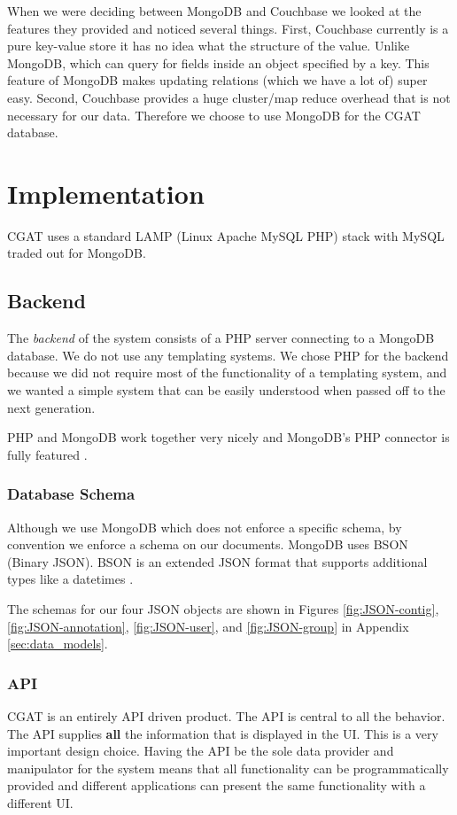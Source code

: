 \documentclass[10pt, conference, compsocconf]{IEEEtran}
\begin{document}
When we were deciding between MongoDB and Couchbase we looked at the features they 
provided and noticed several things. First, Couchbase currently is a pure key-value store it has
no idea what the structure of the value. Unlike MongoDB, which can query for fields inside an 
object specified by a key. This feature of MongoDB makes updating relations (which we 
have a lot of) super easy. Second, Couchbase provides a huge
cluster/map reduce overhead that is not necessary for our data. Therefore we choose to use
MongoDB for the CGAT database.

\section{Implementation}\label{sec:implementation}
CGAT uses a standard LAMP (Linux Apache MySQL PHP) stack with MySQL traded out for MongoDB.

\subsection{Backend}
The \textit{backend} of the system consists of a PHP server connecting to a MongoDB database.
We do not use any templating systems.
We chose PHP for the backend because we did not require most of the functionality of a templating system, and we wanted a simple
system that can be easily understood when passed off to the next generation.

PHP and MongoDB work together very nicely and MongoDB's PHP connector is fully featured \cite{phpMongo}.

\subsubsection{Database Schema}
Although we use MongoDB which does not enforce a specific schema, by convention we enforce a schema on our documents.
MongoDB uses BSON (Binary JSON). BSON is an extended JSON format that supports additional types like a datetimes \cite{bson}.

The schemas for our four JSON objects are shown in Figures \ref{fig:JSON-contig}, \ref{fig:JSON-annotation},
\ref{fig:JSON-user}, and \ref{fig:JSON-group} in Appendix \ref{sec:data_models}.

\subsubsection{API}
CGAT is an entirely API driven product. The API is central to all the behavior.
The API supplies \textbf{all} the information that is displayed in the UI.
This is a very important design choice. Having the API be the sole data provider and manipulator for the system
means that all functionality can be programmatically provided and different applications can present the same
functionality with a different UI.
\end{document}
